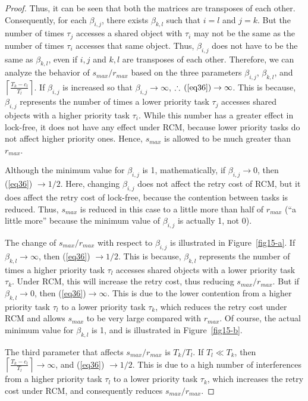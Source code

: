 \documentclass[letter]{sig-alternate}
\begin{document}
\begin{proof}
Thus, it can be seen that both the matrices are transposes of
each other. Consequently, for each $\beta_{i,j}$, there exists $\beta_{k,l}$
such that $i=l$ and $j=k$. But the number of times $\tau_{j}$ accesses
a shared object with $\tau_{i}$ may not be the same as the number of times
$\tau_{i}$ accesses that same object. Thus, $\beta_{i,j}$ does not have
to be the same as $\beta_{k,l}$, even if $i,j$ and $k,l$ are transposes 
of each other. Therefore, we can analyze the behavior of $s_{max}/r_{max}$ based on the three parameters $\beta_{i,j}$, $\beta_{k,l}$, and $\left\lceil\frac{T_{k}-c_{l}}{T_{l}}\right\rceil$.
If $\beta_{i,j}$ is increased so that $\beta_{i,j}\rightarrow\infty$,
$\therefore\,(\ref{eq36})\rightarrow\infty$.
This is because, $\beta_{i,j}$ represents the number of times a lower priority task $\tau_{j}$ accesses 
shared objects with a higher priority task $\tau_{i}$. 
While this number has a greater effect in lock-free, it does not have any effect under RCM, because lower priority tasks do not affect higher priority
ones. Hence, $s_{max}$ is allowed to be much greater than $r_{max}$.

Although the minimum value for $\beta_{i,j}$ is 1, mathematically, if $\beta_{i,j}\rightarrow0$, then (\ref{eq36}) 
 $\rightarrow1/2$.
Here, changing $\beta_{i,j}$ does not affect the retry cost of RCM, but it does affect the retry cost of lock-free, because the contention between tasks is reduced. Thus, $s_{max}$ is reduced in this case to
a little more than half of $r_{max}$ (``a little more''
because the minimum value of $\beta_{i,j}$ is actually 1, not 0).


The change of $s_{max}/r_{max}$ with respect to $\beta_{i,j}$ is illustrated in Figure~\ref{fig15-a}.
If $\beta_{k,l}\rightarrow\infty$, then (\ref{eq36}) $\rightarrow1/2$.
This is because, $\beta_{k,l}$ represents the number of times 
a higher priority task $\tau_{l}$ accesses shared objects with a lower
priority task $\tau_{k}$. Under RCM, this will increase the retry 
cost, thus reducing $s_{max}/r_{max}$. But if $\beta_{k,l}\rightarrow0$, then (\ref{eq36})$\rightarrow\infty$. This is due to the lower contention from a higher priority task $\tau_{l}$ to a lower priority task $\tau_{k}$, which reduces the retry cost under RCM and allows $s_{max}$ to be very large compared with $r_{max}$. Of course, the actual minimum value for $\beta_{k,l}$ is 1, and is illustrated in Figure~\ref{fig15-b}.


The third parameter that affects $s_{max}/r_{max}$ is $T_{k}/T_{l}$.
If $T_{l}\ll T_{k}$, then $\left\lceil\frac{T_{k}-c_{l}}{T_{l}}\right\rceil\rightarrow\infty$,
and (\ref{eq36}) $\rightarrow1/2$. This is due to a high number
of interferences from a higher priority task $\tau_{l}$ to a lower priority
task $\tau_{k}$, which increases the retry cost under RCM, 
and consequently reduces $s_{max}/r_{max}$. 


\end{proof}
\end{document}
